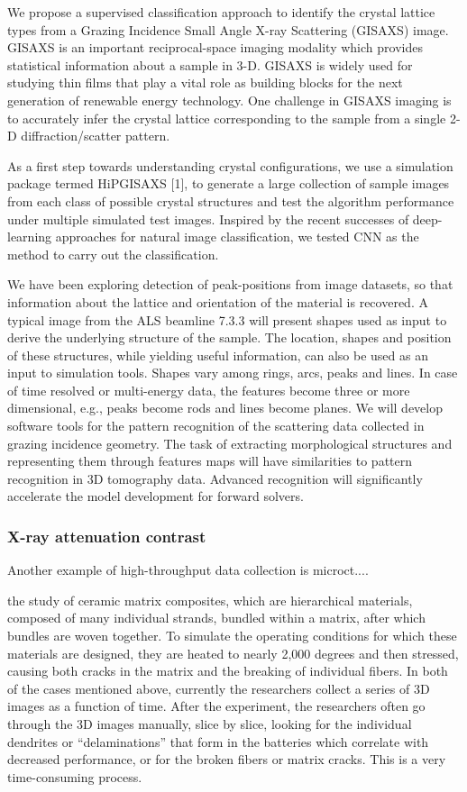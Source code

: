 We propose a supervised classification approach to identify the crystal lattice types from a Grazing Incidence Small Angle X-ray Scattering (GISAXS) image. GISAXS is an important reciprocal-space imaging modality which provides statistical information about a sample in 3-D. GISAXS is widely used for
studying thin films that play a vital role as building blocks for the next generation of renewable energy technology. One challenge in GISAXS imaging is to accurately infer the crystal lattice corresponding to the sample from a single 2-D diffraction/scatter pattern.

As a first step towards understanding crystal configurations, we use a simulation package termed HiPGISAXS [1], to generate a large collection of sample images from each class of possible crystal structures and test the algorithm performance under multiple simulated test images. Inspired by the
recent successes of deep-learning approaches for natural image classification, we tested CNN as the method to carry out the classification.

We have been exploring detection of peak-positions from image datasets, so that information about the lattice and orientation of the material is recovered. A typical image from the ALS beamline 7.3.3 will present shapes used as input to derive the underlying structure of the sample. The location, shapes and position of these structures, while yielding useful information, can also be used as an input to simulation tools. Shapes vary among rings, arcs, peaks and lines. In case of time resolved or multi-energy data, the features become three or more dimensional, e.g., peaks become rods and lines become planes. We will develop software tools for the pattern recognition of the scattering data collected in grazing incidence geometry. The task of extracting morphological structures and representing them through features maps will have similarities to pattern recognition in 3D tomography data. Advanced recognition will significantly accelerate the model development for forward solvers.

\subsubsection{X-ray attenuation contrast}\label{subsec:microct}
Another example of high-throughput data collection is microct....


the study of ceramic matrix composites, which are hierarchical materials, composed of many individual strands, bundled within a matrix, after which bundles are woven together. To simulate the operating conditions for which these materials are designed, they are heated to nearly 2,000 degrees and then stressed, causing both cracks in the matrix and the breaking of individual fibers. In both of the cases mentioned above, currently the researchers collect a series of 3D images as a function of time. After the experiment, the researchers often go through the 3D images manually, slice by slice, looking for the individual dendrites or “delaminations” that form in the batteries which correlate with decreased performance, or for the broken fibers or matrix cracks. This is a very time-consuming process.

